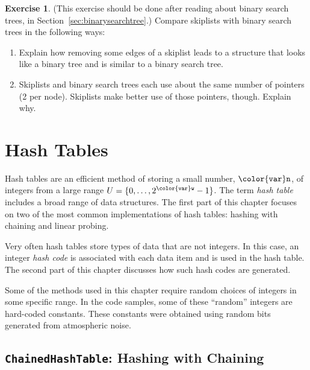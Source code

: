\documentclass[10pt]{book}
\newcommand{\chaplabel}[1]{\label{chap:#1}}
\newcommand{\seclabel}[1]{\label{sec:#1}}
\newcommand{\secref}[1]{Section~\ref{sec:#1}}
\theoremstyle{plain}
\theoremstyle{definition}
\newtheorem{exc}{Exercise}[chapter]
\begin{document}
\begin{exc}
  (This exercise should be done after reading about binary search trees,
  in \secref{binarysearchtree}.)  Compare skiplists with binary search
  trees in the following ways:  
  \begin{enumerate}
     \item Explain how removing some edges of a skiplist leads to
       a structure that looks like a binary tree and is similar to a
       binary search tree.
     \item Skiplists and binary search trees each use about the same
       number of pointers (2 per node).  Skiplists make better use of
       those pointers, though. Explain why.
  \end{enumerate}
\end{exc}

\clearpage

\clearpage
\chapter{Hash Tables}
\chaplabel{hashtables}
\chaplabel{hashing}

Hash tables are an efficient method of storing a small number,
\ensuremath{\mathtt{{\color{var}n}}}, of integers from a large range $U=\{0,\ldots,2^{\ensuremath{\mathtt{{\color{var}w}}}}-1\}$.
The term \emph{hash table}
%
includes a broad range of data structures.  The first part of this
chapter focuses on two of the most common implementations of hash tables:
hashing with chaining and linear probing.

Very often hash tables store types of data that are not integers.
In this case, an integer \emph{hash code}
%
is associated with each data
item and is used in the hash table.  The second part of this chapter
discusses how such hash codes are generated.

Some of the methods used in this chapter require random choices of
integers in some specific range.  In the code samples, some of these
``random'' integers are hard-coded constants.  These constants were
obtained using random bits generated from atmospheric noise.


\section{\texttt{ChainedHashTable}: Hashing with Chaining}
\seclabel{hashtable}
\end{document}
